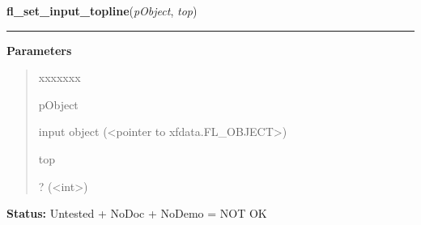 \hspace{.8\funcindent}\begin{boxedminipage}{\funcwidth}

    \raggedright \textbf{fl\_set\_input\_topline}(\textit{pObject}, \textit{top})

    \vspace{-1.5ex}

    \rule{\textwidth}{0.5\fboxrule}
\setlength{\parskip}{2ex}
\setlength{\parskip}{1ex}
      \textbf{Parameters}
      \vspace{-1ex}

      \begin{quote}
        \begin{Ventry}{xxxxxxx}

          \item[pObject]

          input object ({\textless}pointer to 
          xfdata.FL\_OBJECT{\textgreater})

          \item[top]

          ? ({\textless}int{\textgreater})

        \end{Ventry}

      \end{quote}

\textbf{Status:} Untested + NoDoc + NoDemo = NOT OK



    \end{boxedminipage}

    \label{xformslib:library:fl_set_input_scrollbarsize}

    \vspace{0.5ex}

